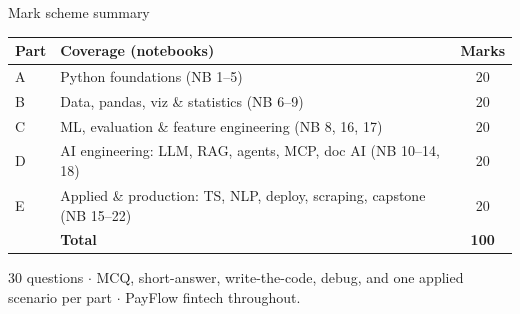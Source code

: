 \documentclass[aspectratio=169,11pt]{beamer}
\begin{document}
\begin{frame}{Mark scheme summary}
\begin{center}
\small
\begin{tabular}{llc}
\toprule
\textbf{Part} & \textbf{Coverage (notebooks)} & \textbf{Marks} \\
\midrule
A & Python foundations (NB 1--5) & 20 \\
B & Data, pandas, viz \& statistics (NB 6--9) & 20 \\
C & ML, evaluation \& feature engineering (NB 8, 16, 17) & 20 \\
D & AI engineering: LLM, RAG, agents, MCP, doc AI (NB 10--14, 18) & 20 \\
E & Applied \& production: TS, NLP, deploy, scraping, capstone (NB 15--22) & 20 \\
\midrule
 & \textbf{Total} & \textbf{100} \\
\bottomrule
\end{tabular}
\end{center}
\medskip
\footnotesize 30 questions $\cdot$ MCQ, short-answer, write-the-code, debug, and one applied scenario per part $\cdot$ PayFlow fintech throughout.
\end{frame}
\end{document}
